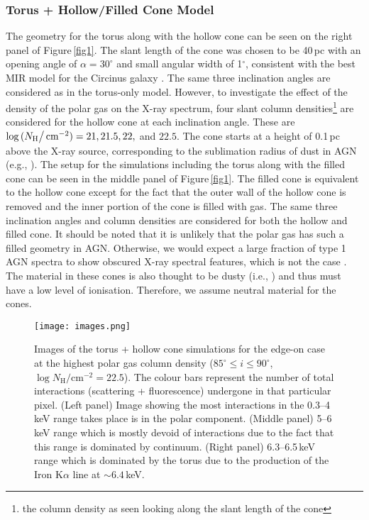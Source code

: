 \documentclass[fleqn,usenatbib]{mnras}
\begin{document}
    \subsubsection{Torus + Hollow/Filled Cone Model}
    
         The geometry for the torus along with the hollow cone can be seen on the right panel of Figure\,\ref{fig1}. The slant length of the cone was chosen to be 40\,pc with an opening angle of $\alpha = 30^{\circ}$ and small angular width of 1$^{\circ}$, consistent with the best MIR model for the Circinus galaxy \citep{10.1093/mnras/stx2227, 10.1093/mnras/stz220}. The same three inclination angles are considered as in the torus-only model. However, to investigate the effect of the density of the polar gas on the X-ray spectrum, four slant column densities\footnote{the column density as seen looking along the slant length of the cone} are considered for the hollow cone at each inclination angle. These are $\log{(N_{\rm H}\big /\text{\,cm}^{-2})} = 21, 21.5, 22,$ and $22.5$. The cone starts at a height of 0.1\,pc above the X-ray source, corresponding to the sublimation radius of dust in AGN (e.g., \citealp{2007A&A...476..713K}). The setup for the simulations including the torus along with the filled cone can be seen in the middle panel of Figure\,\ref{fig1}. The filled cone is equivalent to the hollow cone except for the fact that the outer wall of the hollow cone is removed and the inner portion of the cone is filled with gas. The same three inclination angles and column densities are considered for both the hollow and filled cone. It should be noted that it is unlikely that the polar gas has such a filled geometry in AGN. Otherwise, we would expect a large fraction of type 1 AGN spectra to show obscured X-ray spectral features, which is not the case \citep{Ricci2017, 2017ApJ...850...74K}. The material in these cones is also thought to be dusty (i.e., \citealp{10.1093/mnras/stx2227, 10.1093/mnras/stz220}) and thus must have a low level of ionisation. Therefore, we assume neutral material for the cones.  

    \begin{figure*}
        \centering
        \texttt{[image: images.png]}
        \caption{Images of the torus + hollow cone simulations for the edge-on case at the highest polar gas column density ($85^{\circ} \leq i \leq 90^{\circ}$, $\log{N_{\text{H}}}\big/\text{cm}^{-2} = 22.5$). The colour bars represent the number of total interactions (scattering + fluorescence) undergone in that particular pixel. (Left panel) Image showing the most interactions in the 0.3--4\,keV range takes place is in the polar component. (Middle panel) 5--6\,keV range which is mostly devoid of interactions due to the fact that this range is dominated by continuum. (Right panel) 6.3--6.5\,keV range which is dominated by the torus due to the production of the Iron K$\alpha$ line at $\sim6.4$\,keV.}
        \label{fig4}
    \end{figure*}
    
\end{document}
